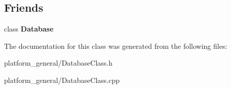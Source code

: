 \subsection*{\-Friends}
\begin{DoxyCompactItemize}
\item 
\hypertarget{classgeneral__server_1_1DatabaseClass_a6efef52d7a939622bbc934ff6b90ffe0}{class {\bfseries \-Database}}\label{classgeneral__server_1_1DatabaseClass_a6efef52d7a939622bbc934ff6b90ffe0}

\end{DoxyCompactItemize}


\-The documentation for this class was generated from the following files\-:\begin{DoxyCompactItemize}
\item 
platform\-\_\-general/\-Database\-Class.\-h\item 
platform\-\_\-general/\-Database\-Class.\-cpp\end{DoxyCompactItemize}
